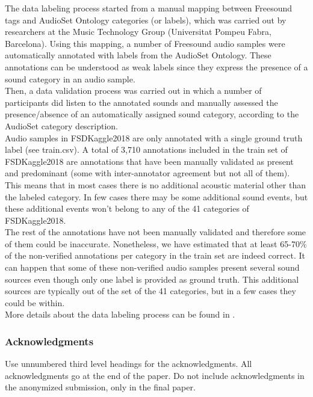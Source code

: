 \documentclass{article} %
\begin{document}
		The data labeling process started from a manual mapping between Freesound tags and AudioSet Ontology categories (or labels), which was carried out by researchers at the Music Technology Group (Universitat Pompeu Fabra, Barcelona). Using this mapping, a number of Freesound audio samples were automatically annotated with labels from the AudioSet Ontology. These annotations can be understood as weak labels since they express the presence of a sound category in an audio sample.\\
		\newline
		Then, a data validation process was carried out in which a number of participants did listen to the annotated sounds and manually assessed the presence/absence of an automatically assigned sound category, according to the AudioSet category description.\\
		\newline
		Audio samples in FSDKaggle2018 are only annotated with a single ground truth label (see train.csv). A total of 3,710 annotations included in the train set of FSDKaggle2018 are annotations that have been manually validated as present and predominant (some with inter-annotator agreement but not all of them). This means that in most cases there is no additional acoustic material other than the labeled category. In few cases there may be some additional sound events, but these additional events won't belong to any of the 41 categories of FSDKaggle2018.\\
		\newline
		The rest of the annotations have not been manually validated and therefore some of them could be inaccurate. Nonetheless, we have estimated that at least 65-70\% of the non-verified annotations per category in the train set are indeed correct. It can happen that some of these non-verified audio samples present several sound sources even though only one label is provided as ground truth. This additional sources are typically out of the set of the 41 categories, but in a few cases they could be within.\\
		\newline
		More details about the data labeling process can be found in \cite{cite11}.

\subsubsection*{Acknowledgments}

Use unnumbered third level headings for the acknowledgments. All
acknowledgments go at the end of the paper. Do not include 
acknowledgments in the anonymized submission, only in the 
final paper. 

\nocite{*}


\end{document}
